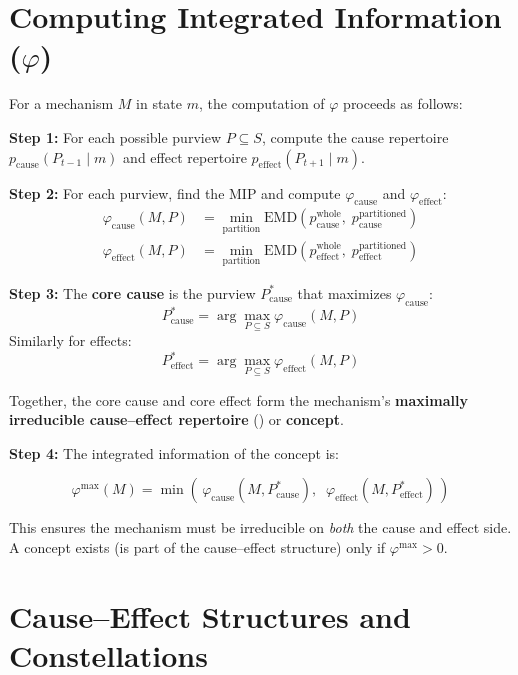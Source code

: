 \documentclass[11pt,a4paper]{report}
\newcommand{\phimax}{\varphi^{\mathrm{max}}}
\newcommand{\phicause}{\varphi_{\mathrm{cause}}}
\newcommand{\phieffect}{\varphi_{\mathrm{effect}}}
\newcommand{\EMD}{\mathrm{EMD}}
\newcommand{\MICE}{\mathrm{MICE}}
\begin{document}
\section{Computing Integrated Information ($\varphi$)}

For a mechanism $M$ in state $m$, the computation of $\varphi$ proceeds as follows:

\textbf{Step 1:} For each possible purview $P \subseteq S$, compute the cause repertoire $p_{\text{cause}}(P_{t-1} \mid m)$ and effect repertoire $p_{\text{effect}}(P_{t+1} \mid m)$.

\textbf{Step 2:} For each purview, find the MIP and compute $\phicause$ and $\phieffect$:
\begin{align}
  \phicause(M, P) &= \min_{\text{partition}} \EMD\!\left(p_{\text{cause}}^{\text{whole}},\; p_{\text{cause}}^{\text{partitioned}}\right) \label{eq:phi_cause} \\[6pt]
  \phieffect(M, P) &= \min_{\text{partition}} \EMD\!\left(p_{\text{effect}}^{\text{whole}},\; p_{\text{effect}}^{\text{partitioned}}\right) \label{eq:phi_effect}
\end{align}

\textbf{Step 3:} The \textbf{core cause} is the purview $P^*_{\text{cause}}$ that maximizes $\phicause$:
\[
  P^*_{\text{cause}} = \arg\max_{P \subseteq S} \phicause(M, P)
\]
Similarly for effects:
\[
  P^*_{\text{effect}} = \arg\max_{P \subseteq S} \phieffect(M, P)
\]

Together, the core cause and core effect form the mechanism's \textbf{maximally irreducible cause--effect repertoire} (\MICE) or \textbf{concept}.

\textbf{Step 4:} The integrated information of the concept is:
\begin{mathbox}
\vspace{-8pt}
\[
  \phimax(M) = \min\!\left(\, \phicause(M, P^*_{\text{cause}}),\;\; \phieffect(M, P^*_{\text{effect}})\,\right)
\]
\vspace{-10pt}
\end{mathbox}

This ensures the mechanism must be irreducible on \emph{both} the cause and effect side. A concept exists (is part of the cause--effect structure) only if $\phimax > 0$.

\section{Cause--Effect Structures and Constellations}
\end{document}
